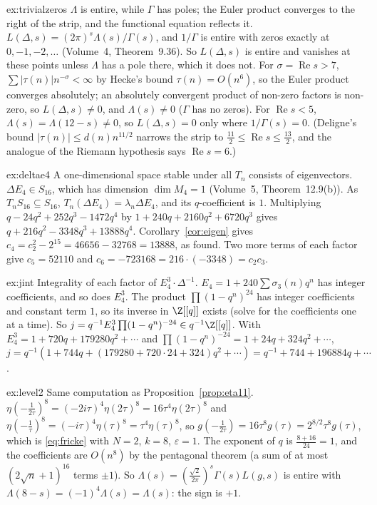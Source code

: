 \begin{solution}{ex:trivialzeros}
\idea $\Lambda$ is entire, while $\Gamma$ has poles; the Euler product converges to the right of the strip, and the functional equation reflects it.
\writeup $L(\Delta,s)=(2\pi)^s\Lambda(s)/\Gamma(s)$, and $1/\Gamma$ is entire with zeros exactly at $0,-1,-2,\dots$ (Volume~4, Theorem~9.36). So $L(\Delta,s)$ is entire and vanishes
at these points unless $\Lambda$ has a pole there, which it does not. For $\sigma=\operatorname{Re}s>7$, $\sum|\tau(n)|n^{-\sigma}<\infty$ by Hecke's bound $\tau(n)=O(n^6)$, so the Euler
product converges absolutely; an absolutely convergent product of non-zero factors is non-zero, so $L(\Delta,s)\ne0$, and $\Lambda(s)\ne0$ ($\Gamma$ has no zeros). For
$\operatorname{Re}s<5$, $\Lambda(s)=\Lambda(12-s)\ne0$, so $L(\Delta,s)=0$ only where $1/\Gamma(s)=0$. (Deligne's bound $|\tau(n)|\le d(n)n^{11/2}$ narrows the strip to
$\frac{11}2\le\operatorname{Re}s\le\frac{13}2$, and the analogue of the Riemann hypothesis says $\operatorname{Re}s=6$.)
\end{solution}

\begin{solution}{ex:deltae4}
\idea A one-dimensional space stable under all $T_n$ consists of eigenvectors.
\writeup $\Delta E_4\in S_{16}$, which has dimension $\dim M_4=1$ (Volume~5, Theorem~12.9(b)). As $T_nS_{16}\subseteq S_{16}$, $T_n(\Delta E_4)=\lambda_n\Delta E_4$, and its $q$-coefficient is
$1$. Multiplying $q-24q^2+252q^3-1472q^4$ by $1+240q+2160q^2+6720q^3$ gives $q+216q^2-3348q^3+13888q^4$. Corollary~\ref{cor:eigen} gives $c_4=c_2^2-2^{15}=46656-32768=13888$, as
found. Two more terms of each factor give $c_5=52110$ and $c_6=-723168=216\cdot(-3348)=c_2c_3$.
\end{solution}

\begin{solution}{ex:jint}
\idea Integrality of each factor of $E_4^3\cdot\Delta^{-1}$.
\writeup $E_4=1+240\sum\sigma_3(n)q^n$ has integer coefficients, and so does $E_4^3$. The product $\prod(1-q^n)^{24}$ has integer coefficients and constant term $1$, so its
inverse in $\Z[[q]]$ exists (solve for the coefficients one at a time). So $j=q^{-1}E_4^3\prod(1-q^n)^{-24}\in q^{-1}\Z[[q]]$. With $E_4^3=1+720q+179280q^2+\cdots$ and
$\prod(1-q^n)^{-24}=1+24q+324q^2+\cdots$, $j=q^{-1}(1+744q+(179280+720\cdot24+324)q^2+\cdots)=q^{-1}+744+196884q+\cdots$.
\end{solution}

\begin{solution}{ex:level2}
\idea Same computation as Proposition~\ref{prop:eta11}.
\writeup $\eta(-\frac1{2\tau})^8=(-2i\tau)^4\eta(2\tau)^8=16\tau^4\eta(2\tau)^8$ and $\eta(-\frac1\tau)^8=(-i\tau)^4\eta(\tau)^8=\tau^4\eta(\tau)^8$, so $g(-\frac1{2\tau})=16\tau^8g(\tau)=2^{8/2}\tau^8g(\tau)$,
which is \eqref{eq:fricke} with $N=2$, $k=8$, $\varepsilon=1$. The exponent of $q$ is $\frac{8+16}{24}=1$, and the coefficients are $O(n^8)$ by the pentagonal theorem (a sum of at most
$(2\sqrt n+1)^{16}$ terms $\pm1$). So $\Lambda(s)=(\frac{\sqrt2}{2\pi})^s\Gamma(s)L(g,s)$ is entire with $\Lambda(8-s)=(-1)^4\Lambda(s)=\Lambda(s)$: the sign is $+1$.
\end{solution}

